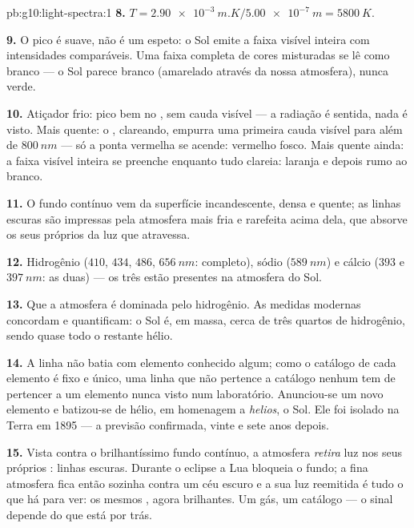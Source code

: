 \begin{solution}{pb:g10:light-spectra:1}
\textbf{8.} $T = \qty{2.90e-3}{m.K} / \qty{5.00e-7}{m} = \qty{5800}{K}$.

\textbf{9.} O pico é suave, não é um espeto: o Sol emite a faixa visível
inteira com intensidades comparáveis. Uma faixa completa de cores misturadas
se lê como branco --- o Sol parece branco (amarelado através da nossa
atmosfera), nunca verde.

\textbf{10.} Atiçador frio: pico bem no , sem cauda visível ---
a radiação é sentida, nada é visto. Mais quente: o , clareando,
empurra uma primeira cauda visível para além de $\qty{800}{nm}$ --- só a
ponta vermelha se acende: vermelho fosco. Mais quente ainda: a faixa visível
inteira se preenche enquanto tudo clareia: laranja e depois rumo ao branco.

\textbf{11.} O fundo contínuo vem da superfície incandescente, densa e
quente; as linhas escuras são impressas pela atmosfera mais fria e
rarefeita acima dela, que absorve os seus próprios  da
luz que atravessa.

\textbf{12.} Hidrogênio ($410$, $434$, $486$, $\qty{656}{nm}$: completo),
sódio ($\qty{589}{nm}$) e cálcio ($393$ e $\qty{397}{nm}$: as duas) --- os
três estão presentes na atmosfera do Sol.

\textbf{13.} Que a atmosfera é dominada pelo hidrogênio. As medidas modernas
concordam e quantificam: o Sol é, em massa, cerca de três quartos de
hidrogênio, sendo quase todo o restante hélio.

\textbf{14.} A linha não batia com elemento conhecido algum; como o catálogo
de cada elemento é fixo e único, uma linha que não pertence a catálogo
nenhum tem de pertencer a um elemento nunca visto num laboratório. Anunciou-se
um novo elemento e batizou-se de hélio, em homenagem a \emph{helios}, o Sol.
Ele foi isolado na Terra em 1895 --- a previsão confirmada, vinte e sete
anos depois.

\textbf{15.} Vista contra o brilhantíssimo fundo contínuo, a atmosfera
\emph{retira} luz nos seus próprios : linhas escuras.
Durante o eclipse a Lua bloqueia o fundo; a fina atmosfera fica então
sozinha contra um céu escuro e a sua luz reemitida é tudo o que há para ver:
os mesmos , agora brilhantes. Um gás, um catálogo --- o
sinal depende do que está por trás.


\end{solution}
